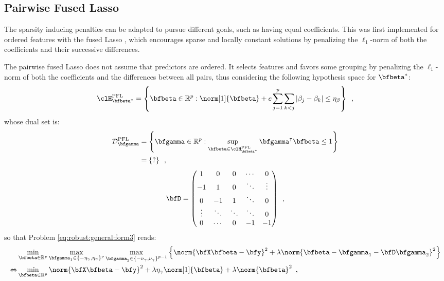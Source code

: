 \subsection{Pairwise Fused Lasso}

The sparsity inducing penalties can be adapted to pursue different goals, such
as having equal coefficients.  This was first implemented for ordered features
with the fused Lasso \citep{Tibshirani05}, which encourages sparse and locally
constant solutions by penalizing the $\ell_1$-norm of both the coefficients and
their successive differences.

The pairwise fused Lasso \citep{Petry11} does not assume that predictors are
ordered.  It selects features and favors some grouping by penalizing the
$\ell_1$-norm of both the coefficients and the differences between all pairs,
thus considering the following hypothesis space for
$\bfbeta^*$:
%
\begin{equation*}
  \mathcal{\clH}^\mathrm{PFL}_{\bfbeta^*} = \left\{ \bfbeta \in \mathbb{R}^p : 
    \norm[1]{\bfbeta}  + c
    \sum_{j=1}^{p} \sum_{k<j} \left| \beta_{j} - \beta_k \right| \leq \eta_\beta
  \right\}
  \enspace,
\end{equation*}
%
whose dual set is:
%
\begin{align*}
  \mathcal{D}^\mathrm{PFL}_{\bfgamma} & = 
    \left\{ \bfgamma \in \mathbb{R}^p : 
            \sup_{\bfbeta \in \mathcal{\clH}^\mathrm{PFL}_{\bfbeta^*}}
            \bfgamma^\intercal\bfbeta \leq 1 
    \right\}
    \\
    & = \left\{ ? \right\}
  \enspace,
\end{align*}
{\color{red}{YG: I believe that the definition of $\bfgamma$ is wrong for the fused Lasso}}
\begin{equation*}
  \bfD = 
  \begin{pmatrix}
      1      &  0     & 0      & \cdots & 0\\
     -1      &  1     & 0      & \ddots & \vdots  \\
      0      & -1     & 1      & \ddots & 0 \\
     \vdots  & \ddots & \ddots & \ddots & 0 \\
      0      & \cdots & 0      & -1     & -1 
  \end{pmatrix}
  \enspace,
\end{equation*}
%
so that Problem \eqref{eq:robust:general:form3} reads:
%
\begin{align*}
  & \min_{\bfbeta\in\mathbb{R}^p} \max_{\bfgamma_1 \in \left\{ -\eta_\gamma, \eta_\gamma \right\}^p}
    \max_{\bfgamma_2 \in \left\{ -\nu_\gamma, \nu_\gamma \right\}^{p-1}}
      \Big\{ \norm{\bfX \bfbeta - \bfy}^2 + \lambda \norm{\bfbeta - \bfgamma_1 - \bfD \bfgamma_2}^2 \Big\} \\
  \Leftrightarrow
    & \min_{\bfbeta\in\mathbb{R}^p}
      \norm{\bfX \bfbeta - \bfy}^2 + \lambda \eta_\gamma \norm[1]{\bfbeta} + \lambda \norm{\bfbeta}^2 
  \enspace,
\end{align*}
%


